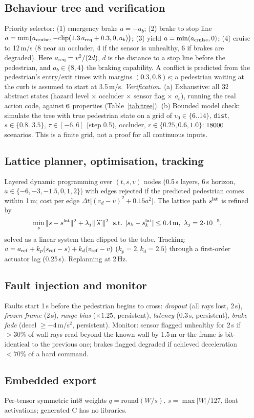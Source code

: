 \subsection{Behaviour tree and verification}
Priority selector: (1) emergency brake $a=-a_b$; (2) brake to stop line $a=\min\!\big(a_{\rm cruise},-\mathrm{clip}(1.3\,a_{\rm req}+0.3,0,a_b)\big)$; (3) yield $a=\min(a_{\rm cruise},0)$; (4) cruise to 12\,m/s (8 near an occluder, 4 if the sensor is unhealthy, 6 if brakes are degraded). Here $a_{\rm req}=v^2/(2d)$, $d$ is the distance to a stop line before the pedestrian, and $a_b\in\{8,4\}$ the braking capability. A conflict is predicted from the pedestrian's entry/exit times with margins $(0.3,0.8)$\,s; a pedestrian waiting at the curb is assumed to start at 3.5\,m/s.
\emph{Verification.} (a) Exhaustive: all $32$ abstract states (hazard level $\times$ occluder $\times$ sensor flag $\times$ $a_b$), running the real action code, against $6$ properties (Table~\ref{tab:tree}). (b) Bounded model check: simulate the tree with true pedestrian state on a grid of $v_0\in\{6..14\}$, \texttt{dist}, $s\in\{0.8..3.5\}$, $\tau\in[-6,6]$ (step 0.5), occluder, $r\in\{0.25,0.6,1.0\}$: $18000$ scenarios. This is a finite grid, not a proof for all continuous inputs.

\subsection{Lattice planner, optimisation, tracking}
Layered dynamic programming over $(t,s,v)$ nodes (0.5\,s layers, 6\,s horizon, $a\in\{-6,-3,-1.5,0,1,2\}$) with edges rejected if the predicted pedestrian comes within 1\,m; cost per edge $\Delta t\big[(v_d-\bar v)^2+0.15a^2\big]$. The lattice path $s^{\rm lat}$ is refined by
\begin{equation}\min_s \|s-s^{\rm lat}\|^2+\lambda_j\|\dddot s\|^2\ \ \text{s.t. } |s_k-s^{\rm lat}_k|\le0.4\,\mathrm{m},\ \lambda_j=2\!\cdot\!10^{-5},\end{equation}
solved as a linear system then clipped to the tube. Tracking: $a=a_{\rm ref}+k_p(s_{\rm ref}-s)+k_d(v_{\rm ref}-v)$ ($k_p{=}2,k_d{=}2.5$) through a first-order actuator lag (0.25\,s). Replanning at 2\,Hz.

\subsection{Fault injection and monitor}
Faults start 1\,s before the pedestrian begins to cross: \emph{dropout} (all rays lost, 2\,s), \emph{frozen frame} (2\,s), \emph{range bias} ($\times1.25$, persistent), \emph{latency} (0.3\,s, persistent), \emph{brake fade} (decel $\ge-4$\,m/s$^2$, persistent). Monitor: sensor flagged unhealthy for 2\,s if $>30\%$ of wall rays read beyond the known wall by 1.5\,m or the frame is bit-identical to the previous one; brakes flagged degraded if achieved deceleration $<70\%$ of a hard command.

\subsection{Embedded export}
Per-tensor symmetric int8 weights $q=\mathrm{round}(W/s)$, $s=\max|W|/127$, float activations; generated C has no libraries.

